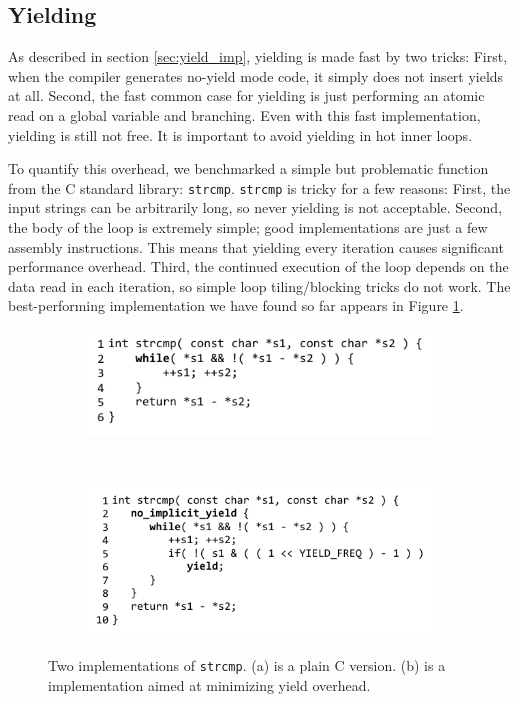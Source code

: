 \documentclass[9pt,preprint]{sigplanconf-2}
\begin{document}
\subsection{Yielding}

As described in section \ref{sec:yield_imp}, yielding is made fast by two tricks:
First, when the compiler generates no-yield mode code, it simply does not insert yields at all.
Second, the fast common case for yielding is just performing an atomic read on a global variable and branching.
Even with this fast implementation, yielding is still not free.
It is important to avoid yielding in hot inner loops.

To quantify this overhead, we benchmarked a simple but problematic function from the C standard library: \texttt{strcmp}.
\texttt{strcmp} is tricky for a few reasons:
First, the input strings can be arbitrarily long, so never yielding is not acceptable.
Second, the body of the loop is extremely simple; good implementations are just a few assembly instructions.
This means that yielding every iteration causes significant performance overhead.
Third, the continued execution of the loop depends on the data read in each iteration, so simple loop tiling/blocking tricks do not work.
The best-performing implementation we have found so far appears in Figure \ref{fig:strcmp}.

\begin{figure}
    \centering
    \begin{subfigure}[b]{0.3\textwidth}
        \hspace{-1.5cm}
        \includegraphics{plain_strcmp}
        \caption{}
    \end{subfigure}
    ~ %
    \begin{subfigure}[b]{0.3\textwidth}
        \hspace{-1.5cm}
        \includegraphics{strcmp_benchmark}
        \caption{}
    \end{subfigure}
    \caption{Two implementations of \texttt{strcmp}.
      (a) is a plain C version.
      (b) is a \charcoal{} implementation aimed at minimizing yield overhead. }
    \label{fig:strcmp}
\end{figure}
\end{document}
